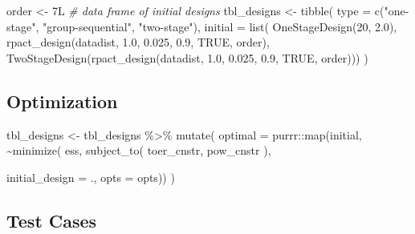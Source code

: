 \documentclass[
]{book}
\newenvironment{Shaded}{\begin{snugshade}}{\end{snugshade}}
\newcommand{\AttributeTok}[1]{\textcolor[rgb]{0.77,0.63,0.00}{#1}}
\newcommand{\CommentTok}[1]{\textcolor[rgb]{0.56,0.35,0.01}{\textit{#1}}}
\newcommand{\ConstantTok}[1]{\textcolor[rgb]{0.00,0.00,0.00}{#1}}
\newcommand{\DecValTok}[1]{\textcolor[rgb]{0.00,0.00,0.81}{#1}}
\newcommand{\FloatTok}[1]{\textcolor[rgb]{0.00,0.00,0.81}{#1}}
\newcommand{\FunctionTok}[1]{\textcolor[rgb]{0.00,0.00,0.00}{#1}}
\newcommand{\NormalTok}[1]{#1}
\newcommand{\OtherTok}[1]{\textcolor[rgb]{0.56,0.35,0.01}{#1}}
\newcommand{\SpecialCharTok}[1]{\textcolor[rgb]{0.00,0.00,0.00}{#1}}
\newcommand{\StringTok}[1]{\textcolor[rgb]{0.31,0.60,0.02}{#1}}
\begin{document}
\begin{Shaded}
\begin{Highlighting}[]
\NormalTok{order }\OtherTok{\textless{}{-}}\NormalTok{ 7L}
\CommentTok{\# data frame of initial designs }
\NormalTok{tbl\_designs }\OtherTok{\textless{}{-}} \FunctionTok{tibble}\NormalTok{(}
    \AttributeTok{type    =} \FunctionTok{c}\NormalTok{(}\StringTok{"one{-}stage"}\NormalTok{, }\StringTok{"group{-}sequential"}\NormalTok{, }\StringTok{"two{-}stage"}\NormalTok{),}
    \AttributeTok{initial =} \FunctionTok{list}\NormalTok{(}
        \FunctionTok{OneStageDesign}\NormalTok{(}\DecValTok{20}\NormalTok{, }\FloatTok{2.0}\NormalTok{),}
        \FunctionTok{rpact\_design}\NormalTok{(datadist, }\FloatTok{1.0}\NormalTok{, }\FloatTok{0.025}\NormalTok{, }\FloatTok{0.9}\NormalTok{, }\ConstantTok{TRUE}\NormalTok{, order),}
        \FunctionTok{TwoStageDesign}\NormalTok{(}\FunctionTok{rpact\_design}\NormalTok{(datadist, }\FloatTok{1.0}\NormalTok{, }\FloatTok{0.025}\NormalTok{, }\FloatTok{0.9}\NormalTok{, }\ConstantTok{TRUE}\NormalTok{, order))) )}
\end{Highlighting}
\end{Shaded}

\hypertarget{optimization-19}{%
\subsection{Optimization}\label{optimization-19}}

\begin{Shaded}
\begin{Highlighting}[]
\NormalTok{tbl\_designs }\OtherTok{\textless{}{-}}\NormalTok{ tbl\_designs }\SpecialCharTok{\%\textgreater{}\%} 
    \FunctionTok{mutate}\NormalTok{(}
       \AttributeTok{optimal =}\NormalTok{ purrr}\SpecialCharTok{::}\FunctionTok{map}\NormalTok{(initial, }\SpecialCharTok{\textasciitilde{}}\FunctionTok{minimize}\NormalTok{(}
\NormalTok{          ess,}
          \FunctionTok{subject\_to}\NormalTok{(}
\NormalTok{              toer\_cnstr,}
\NormalTok{              pow\_cnstr}
\NormalTok{          ),}
          
          \AttributeTok{initial\_design =}\NormalTok{ ., }
          \AttributeTok{opts           =}\NormalTok{ opts)) )}
\end{Highlighting}
\end{Shaded}

\hypertarget{test-cases-20}{%
\subsection{Test Cases}\label{test-cases-20}}
\end{document}
